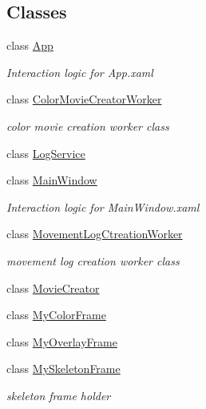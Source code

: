 \subsection*{Classes}
\begin{DoxyCompactItemize}
\item 
class \hyperlink{classUTKinectSkeletonMovementDetector_1_1App}{App}
\begin{DoxyCompactList}\small\item\em Interaction logic for App.\-xaml \end{DoxyCompactList}\item 
class \hyperlink{classUTKinectSkeletonMovementDetector_1_1ColorMovieCreatorWorker}{Color\-Movie\-Creator\-Worker}
\begin{DoxyCompactList}\small\item\em color movie creation worker class \end{DoxyCompactList}\item 
class \hyperlink{classUTKinectSkeletonMovementDetector_1_1LogService}{Log\-Service}
\item 
class \hyperlink{classUTKinectSkeletonMovementDetector_1_1MainWindow}{Main\-Window}
\begin{DoxyCompactList}\small\item\em Interaction logic for Main\-Window.\-xaml \end{DoxyCompactList}\item 
class \hyperlink{classUTKinectSkeletonMovementDetector_1_1MovementLogCtreationWorker}{Movement\-Log\-Ctreation\-Worker}
\begin{DoxyCompactList}\small\item\em movement log creation worker class \end{DoxyCompactList}\item 
class \hyperlink{classUTKinectSkeletonMovementDetector_1_1MovieCreator}{Movie\-Creator}
\item 
class \hyperlink{classUTKinectSkeletonMovementDetector_1_1MyColorFrame}{My\-Color\-Frame}
\item 
class \hyperlink{classUTKinectSkeletonMovementDetector_1_1MyOverlayFrame}{My\-Overlay\-Frame}
\item 
class \hyperlink{classUTKinectSkeletonMovementDetector_1_1MySkeletonFrame}{My\-Skeleton\-Frame}
\begin{DoxyCompactList}\small\item\em skeleton frame holder \end{DoxyCompactList}\item 

\end{DoxyCompactItemize}
